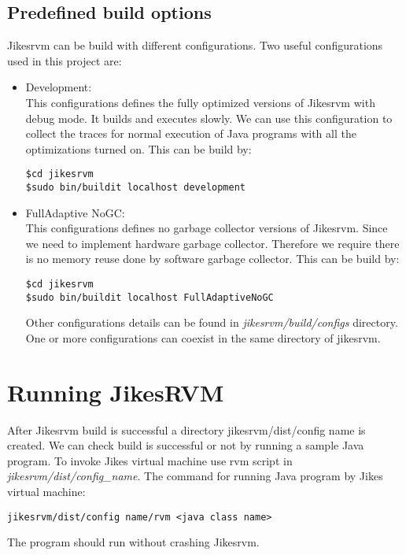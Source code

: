 \documentclass[a4paper]{article}
\begin{document}
\subsection{Predefined build options}
Jikesrvm can be build with different configurations. Two useful configurations used in this project are:
\begin{itemize}
\item Development:\\
This configurations defines the fully optimized versions of Jikesrvm with debug mode.
It builds and executes slowly. We can use this configuration to collect the traces for
normal execution of Java programs with all the optimizations turned on. This can be
build by:
\begin{verbatim}
$cd jikesrvm
$sudo bin/buildit localhost development
\end{verbatim}
\item FullAdaptive NoGC:\\
This configurations defines no garbage collector versions of Jikesrvm. Since we need
to implement hardware garbage collector. Therefore we require there is no memory
reuse done by software garbage collector. This can be build by:
\begin{verbatim}
$cd jikesrvm
$sudo bin/buildit localhost FullAdaptiveNoGC
\end{verbatim}
Other configurations details can be found in \textit{jikesrvm/build/configs	} directory. One or more
configurations can coexist in the same directory of jikesrvm.
\end{itemize}

\section{Running JikesRVM}
After Jikesrvm build is successful a directory jikesrvm/dist/config name is created. We can check build is successful or not by running a sample Java program. To invoke Jikes virtual machine use rvm script in \textit{jikesrvm/dist/config\_name}. The command for running Java program by Jikes virtual machine:
\begin{verbatim}
jikesrvm/dist/config name/rvm <java class name>
\end{verbatim}
The program should run without crashing Jikesrvm.
\end{document}
